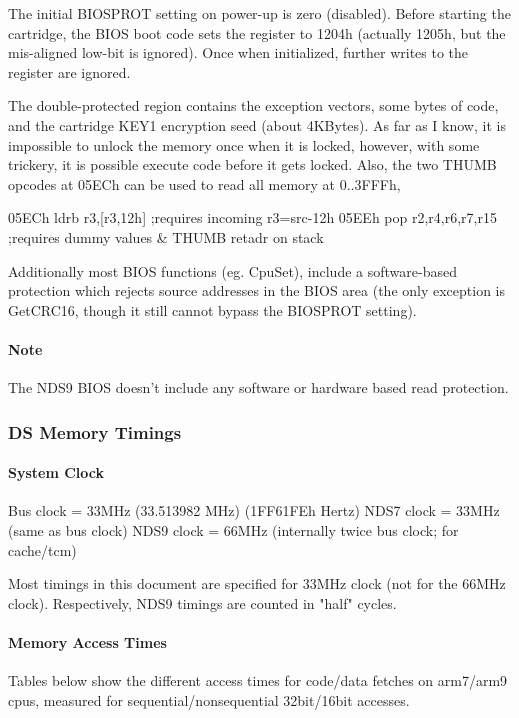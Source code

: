 \documentclass[11pt,a4paper]{proc}
\begin{document}
\begin{flushleft}
The initial BIOSPROT setting on power-up is zero (disabled). Before starting the cartridge, the BIOS boot code sets the register to 1204h (actually 1205h, but the mis-aligned low-bit is ignored). Once when initialized, further writes to the register are ignored.

The double-protected region contains the exception vectors, some bytes of code, and the cartridge KEY1 encryption seed (about 4KBytes). As far as I know, it is impossible to unlock the memory once when it is locked, however, with some trickery, it is possible execute code before it gets locked. Also, the two THUMB opcodes at 05ECh can be used to read all memory at 0..3FFFh,

  05ECh  ldrb r3,[r3,12h]      ;requires incoming r3=src-12h
  05EEh  pop  r2,r4,r6,r7,r15  ;requires dummy values \& THUMB retadr on stack

Additionally most BIOS functions (eg. CpuSet), include a software-based protection which rejects source addresses in the BIOS area (the only exception is GetCRC16, though it still cannot bypass the BIOSPROT setting).

\paragraph{Note}
The NDS9 BIOS doesn't include any software or hardware based read protection.

\subsubsection{DS Memory Timings}

\paragraph{System Clock}

  Bus clock  = 33MHz (33.513982 MHz) (1FF61FEh Hertz)
  NDS7 clock = 33MHz (same as bus clock)
  NDS9 clock = 66MHz (internally twice bus clock; for cache/tcm)

Most timings in this document are specified for 33MHz clock (not for the 66MHz clock). Respectively, NDS9 timings are counted in "half" cycles.

\paragraph{Memory Access Times}
Tables below show the different access times for code/data fetches on arm7/arm9 cpus, measured for sequential/nonsequential 32bit/16bit accesses.


\end{flushleft}
\end{document}
